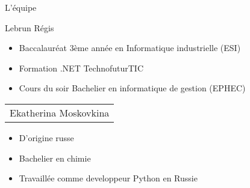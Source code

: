 \begin{frame}{L'équipe}
\begin{minipage}{0.45\textwidth}
Lebrun Régis
\begin{itemize}
  \item Baccalauréat 3ème année en Informatique industrielle (ESI)
  \item Formation .NET TechnofuturTIC
  \item Cours du soir Bachelier en informatique de gestion (EPHEC)
\end{itemize}
\end{minipage}%
\hfill
\begin{minipage}{0.45\textwidth}
\begin{tabular}{|p{\textwidth}}
Ekatherina Moskovkina
\end{tabular}
\begin{itemize}
\item D'origine russe
\item Bachelier en chimie
\item Travaillée comme developpeur Python en Russie
\end{itemize}
\end{minipage}%
\end{frame}